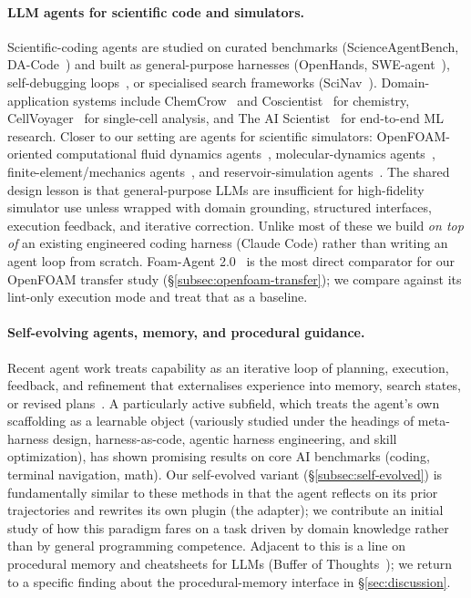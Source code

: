 \documentclass{article}
\begin{document}
\paragraph{LLM agents for scientific code and simulators.}
Scientific-coding agents are studied on curated benchmarks (ScienceAgentBench, DA-Code~\cite{chen2025scienceagentbench,huang2024dacode}) and built as general-purpose harnesses (OpenHands, SWE-agent~\cite{wang2024openhands,yang2024sweagent}), self-debugging loops~\cite{chen2024selfdebug}, or specialised search frameworks (SciNav~\cite{zhang2026scinav}). Domain-application systems include ChemCrow~\cite{bran2024chemcrow} and Coscientist~\cite{boiko2023coscientist} for chemistry, CellVoyager~\cite{alber2025cellvoyager} for single-cell analysis, and The AI Scientist~\cite{lu2024aiscientist,yamada2025ai} for end-to-end ML research. Closer to our setting are agents for scientific simulators: OpenFOAM-oriented computational fluid dynamics agents~\cite{chen2024metaopenfoam,pandey2025openfoamgpt,foamagent2025}, molecular-dynamics agents~\cite{kim2024mdagents,shi2026mdagent2,guilbert2025dynamate,zhao2026polyjarvis}, finite-element/mechanics agents~\cite{zhan2025mooseagent,ni2024mechagents}, and reservoir-simulation agents~\cite{moyner2026jutulgpt}. The shared design lesson is that general-purpose LLMs are insufficient for high-fidelity simulator use unless wrapped with domain grounding, structured interfaces, execution feedback, and iterative correction. Unlike most of these we build \emph{on top of} an existing engineered coding harness (Claude Code) rather than writing an agent loop from scratch. Foam-Agent 2.0~\cite{foamagent2025} is the most direct comparator for our OpenFOAM transfer study (\S\ref{subsec:openfoam-transfer}); we compare against its lint-only execution mode and treat that as a baseline.

\paragraph{Self-evolving agents, memory, and procedural guidance.}
Recent agent work treats capability as an iterative loop of planning, execution, feedback, and refinement that externalises experience into memory, search states, or revised plans~\citep{bran2024chemcrow,boiko2023coscientist,alber2025cellvoyager,lu2024aiscientist,zhang2026scinav,li2026agentflow,tang2026eigenagent,narayanan2024aviary}. A particularly active subfield, which treats the agent's own scaffolding as a learnable object (variously studied under the headings of meta-harness design, harness-as-code, agentic harness engineering, and skill optimization), has shown promising results on core AI benchmarks (coding, terminal navigation, math). Our self-evolved variant (\S\ref{subsec:self-evolved}) is fundamentally similar to these methods in that the agent reflects on its prior trajectories and rewrites its own plugin (the adapter); we contribute an initial study of how this paradigm fares on a task driven by domain knowledge rather than by general programming competence. Adjacent to this is a line on procedural memory and cheatsheets for LLMs (Buffer of Thoughts~\cite{yang2024bot}); we return to a specific finding about the procedural-memory interface in \S\ref{sec:discussion}.
\end{document}
